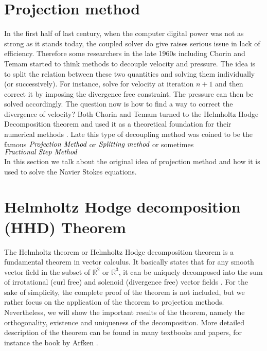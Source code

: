 \section{Projection method}
In the first half of last century, when the computer digital power was not as strong as it stands today, the coupled solver do give raises serious issue in lack of efficiency. Therefore some researchers in the late 1960s including Chorin and Temam started to think methods to decouple velocity and pressure. The idea is to split the relation between these two quantities and solving them individually (or successively). For instance, solve for velocity at iteration $n+1$ and then correct it by imposing the divergence free constraint. The pressure can then be solved accordingly. The question now is how to find a way to correct the divergence of velocity? Both Chorin and Temam turned to the Helmholtz Hodge Decomposition theorem and used it as a theoretical foundation for their numerical methods \cite{chorin1968numerical,chorin1990mathematical,temam1969approximation,brown2001accurate,maria2003application}. Late this type of decoupling method was coined to be the famous $\emph{Projection Method}$ or $\emph{Splitting method}$ or sometimes $\emph{Fractional Step Method}$ \cite{kim1985application,brown2001accurate}\\

In this section we talk about the original idea of projection method and how it is used to solve the Navier Stokes equations.

\section{Helmholtz Hodge decomposition (HHD) Theorem}
The Helmholtz theorem or Helmholtz Hodge decomposition theorem is a fundamental theorem in vector calculus. It basically states that for any smooth vector field in the subset of $\mathbb{R}^2$ or $\mathbb{R}^3$, it can be uniquely decomposed into the sum of irrotational (curl free) and solenoid (divergence free) vector fields \cite{arfken2005mathematical,chorin1990mathematical}. For the sake of simplicity, the complete proof of the theorem is not included, but we rather focus on the application of the theorem to projection methods. Nevertheless, we will show the important results of the theorem, namely the orthogonality, existence and uniqueness of the decomposition. More detailed description of the theorem can be found in many textbooks and papers, for instance the book by Arfken \cite{arfken2005mathematical}.\\

